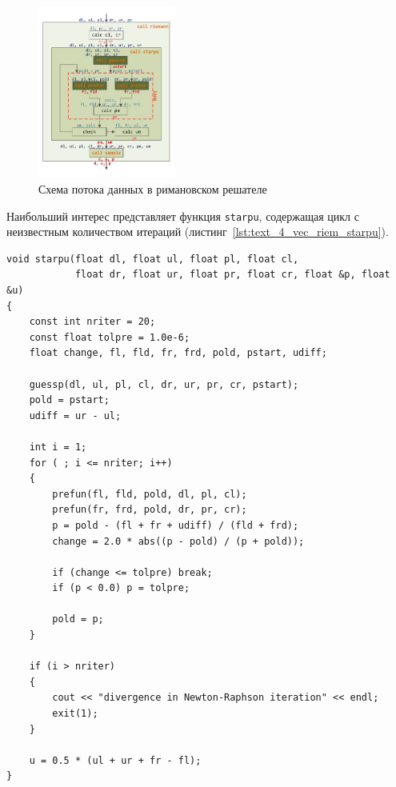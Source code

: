 \begin{figure}[ht]
\centering
\includegraphics[width=0.4\textwidth]{fig/vec_riemann_functions.pdf}
\singlespacing
{}\caption{Схема потока данных в римановском решателе}
\label{fig:text_4_vec_riem_functions}
\end{figure}

Наибольший интерес представляет функция \texttt{starpu}, содержащая цикл с неизвестным количеством итераций (листинг~\ref{lst:text_4_vec_riem_starpu}).

\begin{lstlisting}[caption={Скалярная версия функции \texttt{starpu}.},label={lst:text_4_vec_riem_starpu}]
void starpu(float dl, float ul, float pl, float cl,
            float dr, float ur, float pr, float cr, float &p, float &u)
{
    const int nriter = 20;
    const float tolpre = 1.0e-6;
    float change, fl, fld, fr, frd, pold, pstart, udiff;

    guessp(dl, ul, pl, cl, dr, ur, pr, cr, pstart);
    pold = pstart;
    udiff = ur - ul;

    int i = 1;
    for ( ; i <= nriter; i++)
    {
        prefun(fl, fld, pold, dl, pl, cl);
        prefun(fr, frd, pold, dr, pr, cr);
        p = pold - (fl + fr + udiff) / (fld + frd);
        change = 2.0 * abs((p - pold) / (p + pold));

        if (change <= tolpre) break;
        if (p < 0.0) p = tolpre;

        pold = p;
    }

    if (i > nriter)
    {
        cout << "divergence in Newton-Raphson iteration" << endl;
        exit(1);
    }

    u = 0.5 * (ul + ur + fr - fl);
}
\end{lstlisting}

